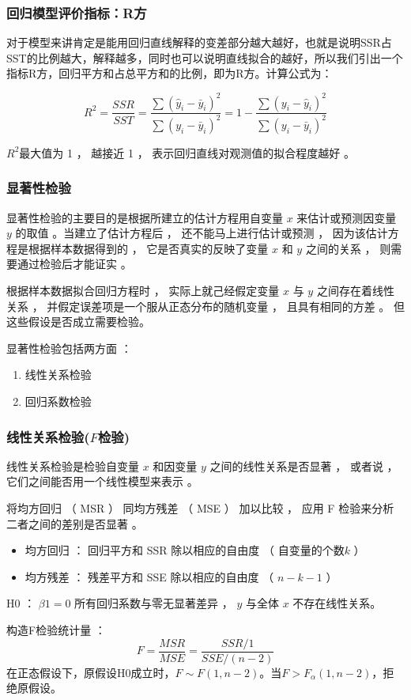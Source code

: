\documentclass[dvipsnames, svgnames, x11names]{beamer}
\begin{document}
\begin{frame}
    \frametitle{回归模型评价指标：R方}
    对于模型来讲肯定是能用回归直线解释的变差部分越大越好，也就是说明SSR占SST的比例越大，解释越多，同时也可以说明直线拟合的越好，所以我们引出一个指标R方，回归平方和占总平方和的比例，即为R方。计算公式为：

    \[
        R^2 = \frac{SSR}{SST} = \frac{\sum (\hat{y}_i-\bar{y}_i)^2}{\sum (y_i-\bar{y}_i)^2} = 1 - \frac{\sum (y_i-\hat{y}_i)^2}{\sum (y_i-\bar{y}_i)^2}
    \]

    $R^2$最大值为 1 ， 越接近 1 ， 表示回归直线对观测值的拟合程度越好 。
\end{frame}


\begin{frame}
    \frametitle{显著性检验}
    显著性检验的主要目的是根据所建立的估计方程用自变量 $x$ 来估计或预测因变量 $y$ 的取值 。当建立了估计方程后 ， 还不能马上进行估计或预测 ， 因为该估计方程是根据样本数据得到的 ， 它是否真实的反映了变量 $x$ 和 $y$ 之间的关系 ， 则需要通过检验后才能证实 。

    根据样本数据拟合回归方程时 ， 实际上就己经假定变量 $x$ 与 $y$ 之间存在着线性关系 ， 并假定误差项是一个服从正态分布的随机变量 ， 且具有相同的方差 。 但这些假设是否成立需要检验。

    显著性检验包括两方面 ：

    \begin{enumerate}
      \item 线性关系检验
      \item 回归系数检验
    \end{enumerate}
\end{frame}


\begin{frame}
    \frametitle{线性关系检验($F$检验)}
    线性关系检验是检验自变量 $x$ 和因变量 $y$ 之间的线性关系是否显著 ， 或者说 ， 它们之间能否用一个线性模型来表示 。

    将均方回归 （ MSR ） 同均方残差 （ MSE ） 加以比较 ， 应用 F 检验来分析二者之间的差别是否显著 。

    \begin{itemize}
      \item 均方回归 ： 回归平方和 SSR 除以相应的自由度 （ 自变量的个数$k$ ）
      \item 均方残差 ： 残差平方和 SSE 除以相应的自由度 （ $n-k-1$ ）
    \end{itemize}

    H0 ： $\beta 1 = 0$ 所有回归系数与零无显著差异 ， $y$ 与全体 $x$ 不存在线性关系。

    构造F检验统计量 ：
    \[
        F = \frac{MSR}{MSE} = \frac{SSR/1}{SSE/(n-2)}
    \]
    在正态假设下，原假设H0成立时，$F\sim F(1,n-2)$。当$F > F_\alpha(1,n-2)$，拒绝原假设。
\end{frame}
\end{document}
